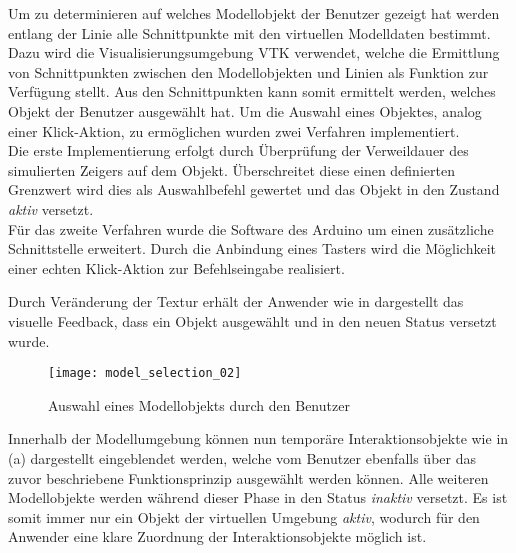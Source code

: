 Um zu determinieren auf welches Modellobjekt der Benutzer gezeigt hat werden entlang der Linie alle Schnittpunkte mit den virtuellen Modelldaten bestimmt. Dazu wird die Visualisierungsumgebung VTK verwendet, welche die Ermittlung von Schnittpunkten zwischen den Modellobjekten und Linien als Funktion zur Verfügung stellt. Aus den Schnittpunkten kann somit ermittelt werden, welches Objekt der Benutzer ausgewählt hat. Um die Auswahl eines Objektes, analog einer \glqq Klick\grqq -Aktion, zu ermöglichen wurden zwei Verfahren implementiert.\\
Die erste Implementierung erfolgt durch Überprüfung der Verweildauer des simulierten Zeigers auf dem Objekt. Überschreitet diese einen definierten Grenzwert wird dies als Auswahlbefehl gewertet und das Objekt in den Zustand \textit{aktiv} versetzt.\\
Für das zweite Verfahren wurde die Software des Arduino um einen zusätzliche Schnittstelle erweitert. Durch die Anbindung eines Tasters wird die Möglichkeit einer echten \glqq Klick\grqq -Aktion zur Befehlseingabe realisiert.

Durch Veränderung der Textur erhält der Anwender wie in  dargestellt das visuelle Feedback, dass ein Objekt ausgewählt und in den neuen Status versetzt wurde.

\begin{figure}[!ht]
	\begin{center}
	\texttt{[image: model\_selection\_02]}
	\caption{Auswahl eines Modellobjekts durch den Benutzer}
	\label{fig.intintersect}
	\end{center}
\end{figure}


Innerhalb der Modellumgebung können nun temporäre Interaktionsobjekte wie in  (a) dargestellt eingeblendet werden, welche vom Benutzer ebenfalls über das zuvor beschriebene Funktionsprinzip ausgewählt werden können. Alle weiteren Modellobjekte werden während dieser Phase in den Status \textit{inaktiv} versetzt. Es ist somit immer nur ein Objekt der virtuellen Umgebung \textit{aktiv}, wodurch für den Anwender eine klare Zuordnung der Interaktionsobjekte möglich ist.

